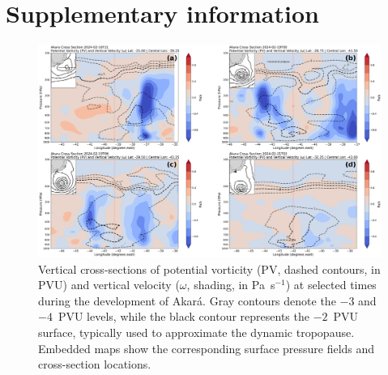 \documentclass[pdflatex,sn-chicago]{sn-jnl}%
\theoremstyle{plain}
\theoremstyle{definition}
\theoremstyle{remark}
\theoremstyle{definition}
\begin{document}
\section*{Supplementary information}

\renewcommand{\thefigure}{S\arabic{figure}}
\setcounter{figure}{0}

\begin{figure}[!htbp]
    \centering
    \includegraphics[width=\textwidth]{pv_composition.png}
    \caption{Vertical cross-sections of potential vorticity (PV, dashed contours, in PVU) and vertical velocity ($\omega$, shading, in Pa~s$^{-1}$) at selected times during the development of Akará. Gray contours denote the $-3$ and $-4$~PVU levels, while the black contour represents the $-2$~PVU surface, typically used to approximate the dynamic tropopause. Embedded maps show the corresponding surface pressure fields and cross-section locations.}
    \label{fig:pv_composition}
\end{figure}
\end{document}
